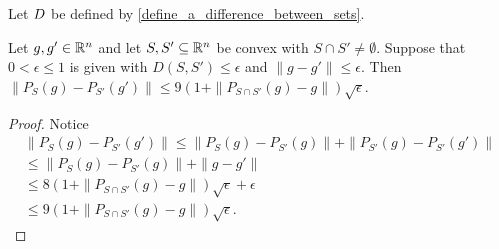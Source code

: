 \begin{corollary}
Let ${D}$ be defined by \cref{define_a_difference_between_sets}.

Let $g, g' \in \mathbb R^n$ and let $S, S' \subseteq \mathbb R^n$ be convex with $S \cap S' \ne \emptyset$.
Suppose that $0 < \epsilon \le 1$ is given with $D\left(S, S'\right) \le \epsilon$ and $\|g - g'\| \le \epsilon$.
Then $\|P_S(g) - P_{S'}(g')\| \le 9\left(1 + \|P_{S \cap S'}(g) - g\|\right) \sqrt{\epsilon}$.
\end{corollary}
\begin{proof}
Notice
\begin{align*}
\|P_S(g) - P_{S'}(g')\| 
\le \|P_S(g) - P_{S'}(g)\| + \|P_{S'}(g) - P_{S'}(g')\| \\
\le \|P_S(g) - P_{S'}(g)\| + \|g - g'\| \\
\le 8\left(1 + \|P_{S \cap S'}(g) - g\|\right) \sqrt{\epsilon} + \epsilon \\
\le 9\left(1 + \|P_{S \cap S'}(g) - g\|\right) \sqrt{\epsilon}.
\end{align*}
\end{proof}

